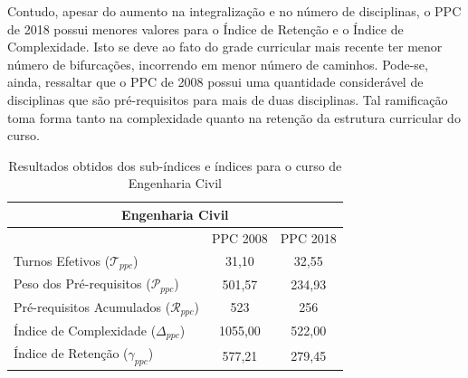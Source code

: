 \documentclass[a4paper, 12pt]{article}
\begin{document}
Contudo, apesar do aumento na integralização e no número de disciplinas, o PPC de 2018 \cite{eng-civil2018} possui menores valores para o Índice de Retenção e o Índice de 
Complexidade. Isto se deve ao fato do grade curricular mais recente ter menor número de bifurcações, incorrendo em menor número de caminhos. Pode-se, ainda, 
ressaltar que o PPC de 2008 \cite{eng-civil2008} possui uma quantidade considerável de disciplinas que são pré-requisitos para mais de duas disciplinas. Tal ramificação toma 
forma tanto na complexidade quanto na retenção da estrutura curricular do curso. 

\vfill

\begin{center}
\begin{table}
\centering
\begin{tabular}{|l|c|c|}
\hline
\multicolumn{3}{|c|}{Engenharia Civil} \\ 
\hline\hline
	& PPC 2008 & PPC 2018 \\
\hline
Turnos Efetivos ($\mathcal{T}_{ppc}$) & 31,10 & 32,55 \\
\hline
Peso dos Pré-requisitos ($\mathcal{P}_{ppc}$) & 501,57 & 234,93 \\
\hline
Pré-requisitos Acumulados ($\mathcal{R}_{ppc}$) & 523 & 256 \\
\hline
Índice de Complexidade ($\Delta_{ppc}$) & 1055,00 & 522,00 \\
\hline
Índice de Retenção ($\gamma_{ppc}$) & 577,21 & 279,45 \\ 
\hline
\end{tabular}
\caption{Resultados obtidos dos sub-índices e índices para o curso de Engenharia Civil}
\end{table}
\end{center}
\end{document}
